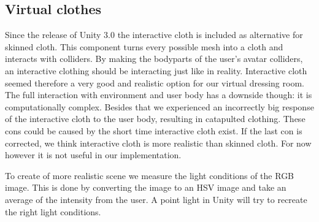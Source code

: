 \documentclass[a4paper]{article}
\begin{document}
\subsection{Virtual clothes}
\label{sec:virtual_clothes}

Since the release of Unity 3.0 the interactive cloth is included as alternative for skinned cloth. This component turns every possible mesh into a cloth and interacts with colliders. By making the bodyparts of the user's avatar colliders, an interactive clothing should be interacting just like in reality. Interactive cloth seemed therefore a very good and realistic option for our virtual dressing room. The full interaction with environment and user body has a downside though: it is computationally complex. Besides that we experienced an incorrectly big response of the interactive cloth to the user body, resulting in catapulted clothing. These cons could be caused by the short time interactive cloth exist. If the last con is corrected, we think interactive cloth is more realistic than skinned cloth. For now however it is not useful in our implementation.

To create of more realistic scene we measure the light conditions of the RGB image. This is done by converting the image to an HSV image and take an average of the intensity from the user.
A point light in Unity will try to recreate the right light conditions.
\end{document}
